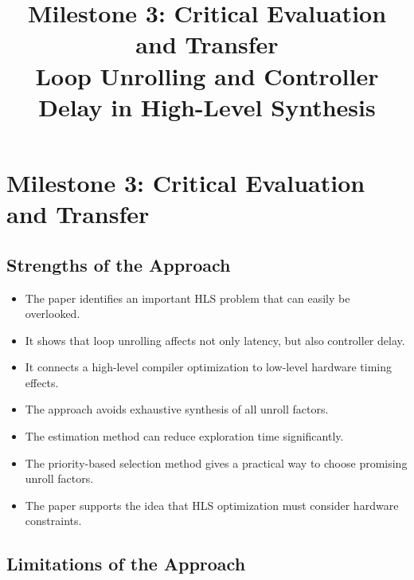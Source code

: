 \documentclass[conference]{IEEEtran}
\begin{document}
\title{Milestone 3: Critical Evaluation and Transfer\\
Loop Unrolling and Controller Delay in High-Level Synthesis}

\author{
}

\maketitle

\section{Milestone 3: Critical Evaluation and Transfer}

\subsection{Strengths of the Approach}

\begin{itemize}
    \item The paper identifies an important HLS problem that can easily be overlooked.
    \item It shows that loop unrolling affects not only latency, but also controller delay.
    \item It connects a high-level compiler optimization to low-level hardware timing effects.
    \item The approach avoids exhaustive synthesis of all unroll factors.
    \item The estimation method can reduce exploration time significantly.
    \item The priority-based selection method gives a practical way to choose promising unroll factors.
    \item The paper supports the idea that HLS optimization must consider hardware constraints.
\end{itemize}

\subsection{Limitations of the Approach}
\end{document}
